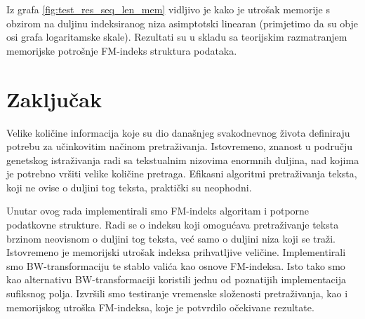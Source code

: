 \documentclass[times, utf8, seminar, numeric]{fer}
\begin{document}
Iz grafa \ref{fig:test_res_seq_len_mem} vidljivo je kako je utrošak memorije s obzirom na
duljinu indeksiranog niza asimptotski linearan (primjetimo da su obje osi grafa logaritamske skale).
Rezultati su u skladu sa teorijskim razmatranjem memorijske potrošnje FM-indeks struktura podataka.

\chapter{Zaključak}

Velike količine informacija koje su dio današnjeg svakodnevnog života definiraju potrebu
za učinkovitim načinom pretraživanja. Istovremeno, znanost u području genetskog istraživanja
radi sa tekstualnim nizovima enormnih duljina, nad kojima je potrebno vršiti velike količine
pretraga. Efikasni algoritmi pretraživanja teksta, koji ne ovise o duljini tog teksta,
praktički su neophodni.

Unutar ovog rada implementirali smo FM-indeks algoritam i potporne podatkovne strukture.
Radi se o indeksu koji omogućava pretraživanje teksta brzinom neovisnom o duljini tog
teksta, već samo o duljini niza koji se traži. Istovremeno je memorijski utrošak
indeksa prihvatljive veličine. Implementirali smo BW-transformaciju te stablo valića
kao osnove FM-indeksa. Isto tako smo kao alternativu BW-transformaciji koristili
jednu od poznatijih implementacija sufiksnog polja. Izvršili smo testiranje vremenske
složenosti pretraživanja, kao i memorijskog utroška FM-indeksa, koje je potvrdilo očekivane
rezultate.



\end{document}
